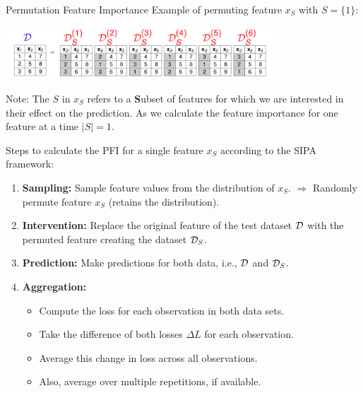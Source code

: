\documentclass[11pt,compress,t,notes=noshow, xcolor=table]{beamer}
\begin{document}
\begin{vbframe}{Permutation Feature Importance}
Example of permuting feature $x_S$ with $S = \{1\}$:

\begin{center}
\includegraphics[width=0.75\textwidth]{figure_man/permuted-fv.png}
\end{center}

\vspace*{0.2cm}
{\scriptsize{Note: 
The $S$ in $x_S$ refers to a \textbf{S}ubset of features for which we are interested in their effect on the prediction.
As we calculate the feature importance for one feature at a time $|S| = 1$.}\par}

\framebreak 

Steps to calculate the PFI for a single feature $x_S$ according to the SIPA framework:
\begin{enumerate}
  \item \textbf{Sampling:} Sample feature values from the distribution of $x_S$. \newline $\Rightarrow$ Randomly permute feature $x_S$ (retains the distribution).
  \lz
  \item \textbf{Intervention:} Replace the original feature of the test dataset $\D$  with the permuted feature  creating the dataset $\D_{S}$.
  \lz
  \item \textbf{Prediction:} Make predictions for both data, i.e., $\D$ and $\D_{S}$.
  \lz
  \item \textbf{Aggregation:} 
    \begin{itemize}
      \item Compute the loss for each observation in both data sets.
      \item Take the difference of both losses $\Delta L$ for each observation.
      \item Average this change in loss across all observations.
      \item Also, average over multiple repetitions, if available.
    \end{itemize}
\end{enumerate}
\end{vbframe}
\end{document}
